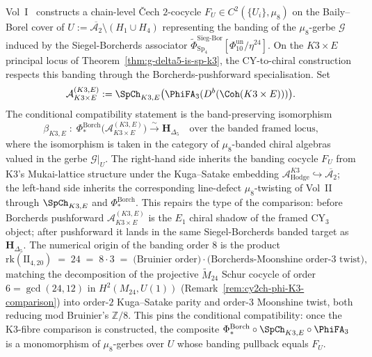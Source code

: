 \begin{remark}
\label{rem:cy2ch-phi3-mu8-banding-compatibility}
Vol~I~\cite{VolI} constructs a
chain-level \v Cech $2$-cocycle
$F_U\in C^2(\{U_i\},\mu_8)$ on the Baily--Borel cover of
$U := \overline{\mathcal{A}_2}\setminus(H_1\cup H_4)$ representing the
banding of the $\mu_8$-gerbe $\mathcal{G}$ induced by the
Siegel-Borcherds associator
$\widetilde{\Phi}^{\mathrm{Sieg\text{-}Bor}}_{\mathrm{Sp}_4}
[\Phi_{10}^{\mathrm{un}}/\eta^{24}]$. On the $K3\times E$ principal locus of
Theorem~\ref{thm:g-delta5-is-sp-k3}, the CY-to-chiral construction
respects this banding through the Borcherds-pushforward specialisation.
Set
\[
 \mathcal A_{K3\times E}^{(K3,E)}
 :=
 \SpCh_{K3,E}\bigl(\PhiFA_3(D^b(\Coh(K3\times E)))\bigr).
\]
The conditional compatibility statement is the band-preserving
isomorphism
\[
 \beta_{K3,E}\;:\;
 \Phi^{\mathrm{Borch}}_*
 \bigl(\mathcal A_{K3\times E}^{(K3,E)}\bigr)
 \xrightarrow{\ \sim\ }
 \mathbf{H}_{\Delta_5}
 \quad\text{over the banded framed locus,}
\]
where the isomorphism is taken in the category of $\mu_8$-banded chiral
algebras valued in the gerbe $\mathcal{G}|_U$. The right-hand side inherits
the banding cocycle
$F_U$ from K3's Mukai-lattice structure under the
Kuga--Satake embedding
$\mathcal{A}^{K3}_{\mathrm{Hodge}}\hookrightarrow
\overline{\mathcal{A}_2}$; the left-hand side inherits the corresponding
line-defect $\mu_8$-twisting of Vol~II~\cite{VolII}
through $\SpCh_{K3,E}$ and $\Phi^{\mathrm{Borch}}_*$. This repairs the
type of the comparison: before Borcherds pushforward
$\mathcal A_{K3\times E}^{(K3,E)}$ is the $E_1$ chiral shadow of the
framed CY$_3$ object; after pushforward it lands in the same
Siegel-Borcherds banded target as $\mathbf H_{\Delta_5}$. The numerical origin
of the banding order $8$ is the product
\[
 \mathrm{rk}(\mathrm{II}_{4,20}) \;=\; 24
 \;=\; 8 \cdot 3
 \;=\; \bigl(\text{Bruinier order}\bigr)\cdot\bigl(\text{Borcherds-Moonshine
 order-3 twist}\bigr),
\]
matching the decomposition of the projective $\widetilde{M}_{24}$
Schur cocycle of order~$6 = \gcd(24, 12)$ in $H^2(M_{24},U(1))$
(Remark~\ref{rem:cy2ch-phi-K3-comparison}) into order-$2$
Kuga--Satake parity and order-$3$ Moonshine twist, both reducing mod
Bruinier's $\mathbb Z/8$. This pins the conditional compatibility: once
the K3-fibre comparison is constructed, the composite
$\Phi^{\mathrm{Borch}}_*\circ\SpCh_{K3,E}\circ\PhiFA_3$ is a
monomorphism of $\mu_8$-gerbes over $U$ whose banding pullback equals
$F_U$.
\end{remark}

